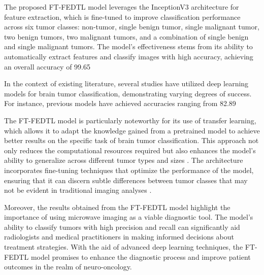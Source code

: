 \documentclass[runningheads]{llncs}
\begin{document}
The proposed FT-FEDTL model leverages the InceptionV3 architecture for feature extraction, which is fine-tuned to improve classification performance across six tumor classes: non-tumor, single benign tumor, single malignant tumor, two benign tumors, two malignant tumors, and a combination of single benign and single malignant tumors. The model's effectiveness stems from its ability to automatically extract features and classify images with high accuracy, achieving an overall accuracy of 99.65%

In the context of existing literature, several studies have utilized deep learning models for brain tumor classification, demonstrating varying degrees of success. For instance, previous models have achieved accuracies ranging from 82.89%

The FT-FEDTL model is particularly noteworthy for its use of transfer learning, which allows it to adapt the knowledge gained from a pretrained model to achieve better results on the specific task of brain tumor classification. This approach not only reduces the computational resources required but also enhances the model's ability to generalize across different tumor types and sizes \cite{Amran_2024}. The architecture incorporates fine-tuning techniques that optimize the performance of the model, ensuring that it can discern subtle differences between tumor classes that may not be evident in traditional imaging analyses \cite{Amran_2024}.

Moreover, the results obtained from the FT-FEDTL model highlight the importance of using microwave imaging as a viable diagnostic tool. The model's ability to classify tumors with high precision and recall can significantly aid radiologists and medical practitioners in making informed decisions about treatment strategies. With the aid of advanced deep learning techniques, the FT-FEDTL model promises to enhance the diagnostic process and improve patient outcomes in the realm of neuro-oncology.
\end{document}
